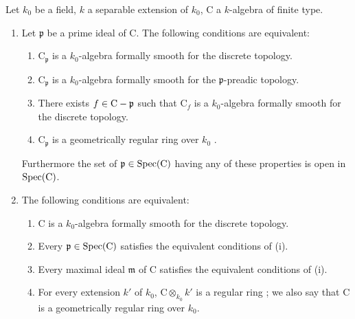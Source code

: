 \begin{proposition}[22.6.7]
\label{0.22.6.7}
Let $k_0$ be a field, $k$ a separable extension of $k_0$, $\mathrm{C}$ a $k$-algebra of finite type.
\begin{enumerate}
  \item[\rm{(i)}] Let $\mathfrak{p}$ be a prime ideal of $\mathrm{C}$.
  The following conditions are equivalent:
  \begin{enumerate}
    \item[\textup{a)}] $\mathrm{C}_\mathfrak{p}$ is a $k_0$-algebra formally smooth for the discrete topology.
    \item[\textup{b)}] $\mathrm{C}_\mathfrak{p}$ is a $k_0$-algebra formally smooth for the $\mathfrak{p}$-preadic topology.
    \item[\textup{c)}] There exists $f\in\mathrm{C}-\mathfrak{p}$ such that $\mathrm{C}_f$ is a $k_0$-algebra formally smooth for the discrete topology.
    \item[\textup{d)}] $\mathrm{C}_\mathfrak{p}$ is a geometrically regular ring over $k_0$ .
  \end{enumerate}
  Furthermore the set of $\mathfrak{p}\in\operatorname{Spec}(\mathrm{C})$ having any of these properties is open in $\operatorname{Spec}(\mathrm{C})$.
  \item[\rm{(ii)}] The following conditions are equivalent:
  \begin{enumerate}
    \item[\textup{a)}] $\mathrm{C}$ is a $k_0$-algebra formally smooth for the discrete topology.
    \item[\textup{b)}] Every $\mathfrak{p}\in\operatorname{Spec}(\mathrm{C})$ satisfies the equivalent conditions of \textup{(i)}.
    \item[\textup{c)}] Every maximal ideal $\mathfrak{m}$ of $\mathrm{C}$ satisfies the equivalent conditions of \textup{(i)}.
    \item[\textup{d)}] For every extension $k'$ of $k_0$, $\mathrm{C}\otimes_{k_0}k'$ is a regular ring ; we also say that $\mathrm{C}$ is a geometrically regular ring over $k_0$.
  \end{enumerate}



\end{enumerate}
\end{proposition}
